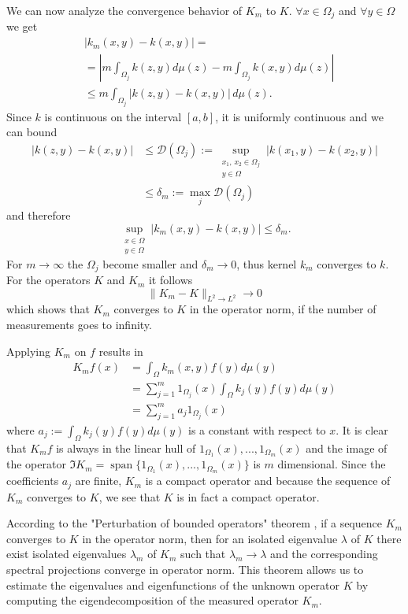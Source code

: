 \documentclass[twoside,11pt]{article}
\begin{document}
\noindent We can now analyze the convergence behavior of $K_m$ to $K$.
$\forall x \in \Omega_j$ and $\forall y \in \Omega$ we get
\begin{align*}
& \left| k_m(x,y) - k(x,y) \right| =\\
& = \left| m \int_{\Omega_j} k(z,y) d\mu(z)
 - m \int_{\Omega_j} k(x,y) d\mu(z) \right| \\
& \leq m \int_{\Omega_j} \left| k(z,y) - k(x,y) \right| \, d\mu(z).
\end{align*}
Since $k$ is continuous on the interval $[a,b]$, it is uniformly continuous
and we can bound
\begin{align*}
\left| k(z,y) - k(x,y) \right|
& \leq \mathcal{D}(\Omega_j)
 := \sup_{\substack{x_1, \, x_2 \in \Omega_j\\ y \in \Omega}}
  \left| k(x_1,y) - k(x_2,y) \right| \\
& \leq \delta_m := \max_j \mathcal{D}(\Omega_j)
\end{align*}
and therefore
\[
\sup_{\substack{x \in \Omega \\ y \in \Omega}}\left| k_m(x,y) - k(x,y) \right|
\leq \delta_m.
\]
For $m \to \infty$ the $\Omega_j$ become smaller and $\delta_m \to 0$,
thus kernel $k_m$ converges to $k$.
For the operators $K$ and $K_m$ it follows
\[
\| K_m - K \|_{L^2 \to L^2} \to 0
\]
which shows that $K_m$ converges to $K$ in the operator norm,
if the number of measurements goes to infinity.

\noindent Applying $K_m$ on $f$ results in
\begin{align*}
K_m f(x)
& = \int_{\Omega} k_m(x,y) f(y) d\mu(y) \\
& = \sum_{j=1}^m 1_{\Omega_j}(x) \int_{\Omega} k_j(y) f(y) d\mu(y) \\
& = \sum_{j=1}^m a_j 1_{\Omega_j}(x)
\end{align*}
where $a_j:=\int_{\Omega} k_j(y) f(y) d\mu(y)$ is a constant with respect to $x$.
It is clear that $K_m f$ is always in the linear hull of
$1_{\Omega_1}(x),...,1_{\Omega_m}(x)$ and the image of the operator
$\Im K_m=\operatorname{span}\{1_{\Omega_1}(x),...,1_{\Omega_m}(x)\}$ is $m$ dimensional.
Since the coefficients $a_j$ are finite, $K_m$ is a compact operator
and because the sequence of $K_m$ converges to $K$,
we see that $K$ is in fact a compact operator.

According to the "Perturbation of bounded operators" theorem \cite{DBLP:conf/colt/LuxburgBB04},
if a sequence $K_m$ converges to $K$ in the operator norm,
then for an isolated eigenvalue $\lambda$ of $K$
there exist isolated eigenvalues $\lambda_m$ of $K_m$
such that $\lambda_m \to \lambda$
and the corresponding spectral projections converge in operator norm.
This theorem allows us to estimate the eigenvalues and eigenfunctions of
the unknown operator $K$ by computing the eigendecomposition
of the measured operator $K_m$.
\end{document}
